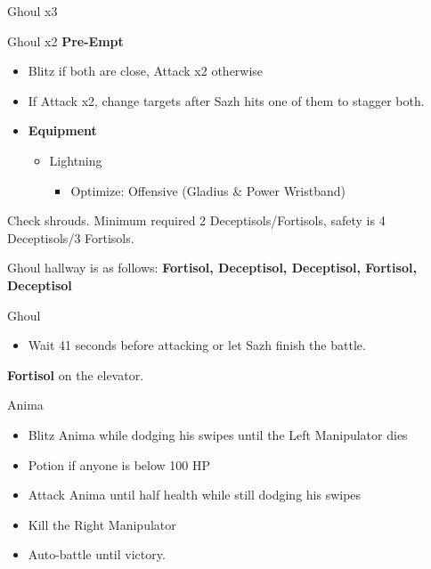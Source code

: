 \begin{paracol}{2}
\begin{battle}{Ghoul x3}
\end{battle}

\begin{battle}{Ghoul x2 \textbf{Pre-Empt}}
\begin{itemize}
    \item Blitz if both are close, Attack x2 otherwise
    \item If Attack x2, change targets after Sazh hits one of them to stagger both.
\end{itemize}
\end{battle}


\begin{menu}
\begin{itemize}
    \item \textbf{Equipment}
    \begin{itemize}
        \item Lightning
        \begin{itemize}
            \item Optimize: Offensive (Gladius \& Power Wristband)
        \end{itemize}
    \end{itemize}
\end{itemize}
\end{menu}
\switchcolumn*

	Check shrouds. Minimum required 2 Deceptisols/Fortisols, safety is 4 Deceptisols/3 Fortisols.

	Ghoul hallway is as follows: {\bf Fortisol, Deceptisol, Deceptisol, Fortisol, Deceptisol}

	\begin{battle}{Ghoul}
		\begin{itemize}
			\item Wait 41 seconds before attacking or let Sazh finish the battle.
		\end{itemize}
	\end{battle}

	\textbf{Fortisol} on the elevator.

	\begin{battle}{Anima}

		\begin{itemize}
			\item Blitz Anima while dodging his swipes until the Left Manipulator dies
			\item Potion if anyone is below 100 HP
			\item Attack Anima until half health while still dodging his swipes
			\item Kill the Right Manipulator
			\item Auto-battle until victory.
		\end{itemize}
	\end{battle}


\end{paracol}
